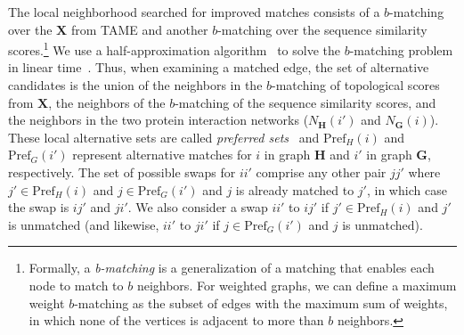 \documentclass[10pt, journal, compsoc, final]{IEEEtran}
\newcommand{\bs}[1]{\boldsymbol{#1}}
\newcommand{\Matrix}[1]{\mathbf{#1}}
\newcommand{\Graph}[1]{\mathit{\mathbf{\bs{#1}}}}
\newcommand{\Set}[1]{\mathit{#1}}
\begin{document}
The local neighborhood searched for improved matches consists of a $b$-matching over the $\Matrix{X}$ from TAME and another $b$-matching over the sequence similarity scores.\footnote{Formally, a \emph{b-matching} is a generalization of a matching that enables each node to match to $b$ neighbors. For weighted graphs, we can define a maximum weight $b$-matching as the subset of edges with the maximum sum of weights, in which none of the vertices is adjacent to more than $b$ neighbors.} We use a half-approximation algorithm~\cite{bMatching} to solve the $b$-matching problem in linear time~\cite{Arif}. Thus, when examining a matched edge, the set of alternative candidates is the union of the neighbors in the $b$-matching of topological scores from $\Matrix{X}$, the neighbors of the $b$-matching of the sequence similarity scores, and the neighbors in the two protein interaction networks ($\Set{N}_\Graph{H}(i')$ and $\Set{N}_\Graph{G}(i)$).  These local alternative sets are called \emph{preferred sets}~\cite{PISWAP} and $\text{Pref}_{H}(i)$ and $\text{Pref}_{G}(i')$ represent alternative matches for $i$ in graph $\Graph{H}$ and $i'$ in graph $\Graph{G}$, respectively. The set of possible swaps for $ii'$ comprise any other pair $jj'$ where $j' \in \text{Pref}_H(i)$ and $j \in \text{Pref}_G(i')$ and $j$ is already matched to $j'$, in which case the swap is $ij'$ and $ji'$. We also consider a swap $ii'$ to $ij'$ if $j' \in \text{Pref}_H(i)$ and $j'$ is unmatched (and likewise, $ii'$ to $ji'$ if $j \in  \text{Pref}_G(i')$ and $j$ is unmatched). 
\end{document}
